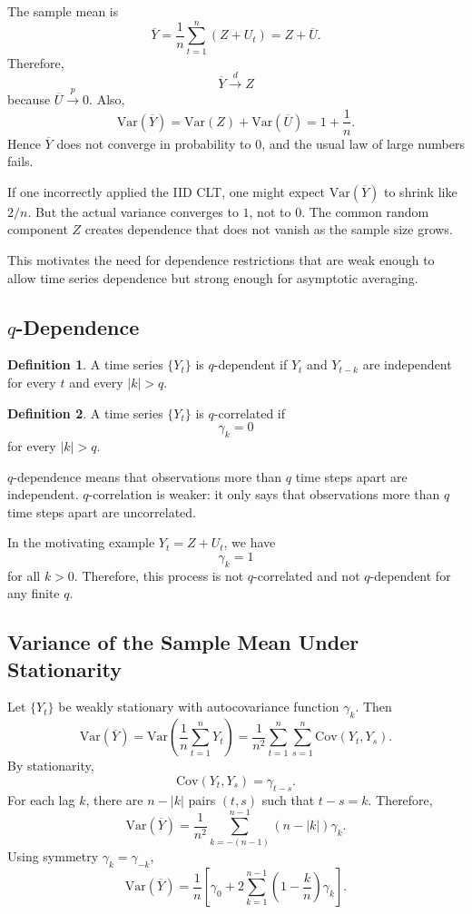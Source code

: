 \documentclass[12pt,oneside]{book}
\numberwithin{equation}{section}
\theoremstyle{definition}
\newtheorem{definition}{Definition}[section]
\theoremstyle{plain}
\theoremstyle{remark}
\newcommand{\Var}{\mathrm{Var}}
\newcommand{\Cov}{\mathrm{Cov}}
\newcommand{\convd}{\overset{d}{\to}}
\newcommand{\convp}{\overset{p}{\to}}
\begin{document}
The sample mean is
\[
\overline{Y}
=
\frac{1}{n}\sum_{t=1}^n (Z+U_t)
=
Z+\overline{U}.
\]
Therefore,
\[
\overline{Y}\convd Z
\]
because $\overline{U}\convp 0$. Also,
\[
\Var(\overline{Y})
=
\Var(Z)+\Var(\overline{U})
=
1+\frac{1}{n}.
\]
Hence $\overline{Y}$ does not converge in probability to $0$, and the usual law of large numbers fails.

If one incorrectly applied the IID CLT, one might expect $\Var(\overline{Y})$ to shrink like $2/n$. But the actual variance converges to $1$, not to $0$. The common random component $Z$ creates dependence that does not vanish as the sample size grows.

This motivates the need for dependence restrictions that are weak enough to allow time series dependence but strong enough for asymptotic averaging.

\subsection*{$q$-Dependence}

\begin{definition}
A time series $\{Y_t\}$ is $q$-dependent if $Y_t$ and $Y_{t-k}$ are independent for every $t$ and every $|k|>q$.
\end{definition}

\begin{definition}
A time series $\{Y_t\}$ is $q$-correlated if
\[
\gamma_k=0
\]
for every $|k|>q$.
\end{definition}

$q$-dependence means that observations more than $q$ time steps apart are independent. $q$-correlation is weaker: it only says that observations more than $q$ time steps apart are uncorrelated.

In the motivating example $Y_t=Z+U_t$, we have
\[
\gamma_k=1
\]
for all $k>0$. Therefore, this process is not $q$-correlated and not $q$-dependent for any finite $q$.

\subsection*{Variance of the Sample Mean Under Stationarity}

Let $\{Y_t\}$ be weakly stationary with autocovariance function $\gamma_k$. Then
\[
\Var(\overline{Y})
=
\Var\left(\frac{1}{n}\sum_{t=1}^n Y_t\right)
=
\frac{1}{n^2}\sum_{t=1}^n\sum_{s=1}^n \Cov(Y_t,Y_s).
\]
By stationarity,
\[
\Cov(Y_t,Y_s)=\gamma_{t-s}.
\]
For each lag $k$, there are $n-|k|$ pairs $(t,s)$ such that $t-s=k$. Therefore,
\[
\Var(\overline{Y})
=
\frac{1}{n^2}
\sum_{k=-(n-1)}^{n-1}
(n-|k|)\gamma_k.
\]
Using symmetry $\gamma_k=\gamma_{-k}$,
\[
\Var(\overline{Y})
=
\frac{1}{n}
\left[
\gamma_0
+
2\sum_{k=1}^{n-1}
\left(1-\frac{k}{n}\right)\gamma_k
\right].
\]
\end{document}
